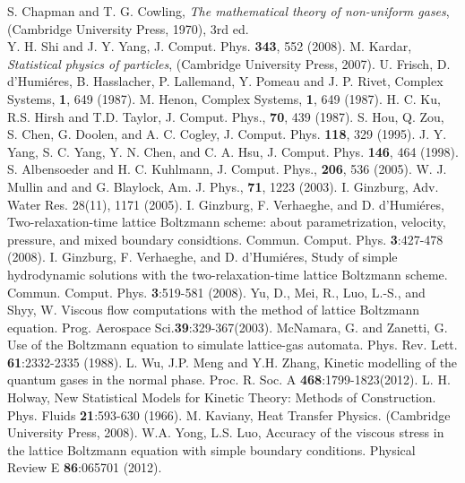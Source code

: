 \documentclass[doublecol]{epl2}
\begin{document}
\begin{thebibliography}{0}
 S. Chapman and  T. G. Cowling, {\sl The mathematical theory of non-uniform gases}, (Cambridge University Press, 1970), 3rd ed. \\
 Y. H. Shi and J. Y. Yang, J. Comput. Phys. {\bf 343}, 552 (2008).
 M. Kardar, {\sl Statistical physics of particles}, (Cambridge University Press, 2007).
 U. Frisch, D. d'Humi\'{e}res, B. Hasslacher, P. Lallemand, Y. Pomeau and J. P. Rivet, Complex Systems, {\bf 1}, 649 (1987).
 M. Henon, Complex Systems, {\bf 1}, 649 (1987).
 H. C. Ku, R.S. Hirsh and T.D. Taylor, J. Comput. Phys., {\bf 70}, 439 (1987).
S. Hou, Q. Zou, S. Chen, G. Doolen, and A. C. Cogley, J. Comput. Phys. {\bf 118}, 329 (1995).
J. Y. Yang, S. C. Yang, Y. N. Chen, and C. A. Hsu, J. Comput. Phys. {\bf 146}, 464 (1998).
 S. Albensoeder and H. C. Kuhlmann, J. Comput. Phys., {\bf 206}, 536 (2005).
 W. J. Mullin and and G. Blaylock, Am. J. Phys., {\bf 71}, 1223 (2003).
I. Ginzburg, Adv. Water Res. 28(11), 1171 (2005).
 I. Ginzburg, F. Verhaeghe, and D. d'Humi\'{e}res, Two-relaxation-time lattice Boltzmann scheme: about parametrization, velocity, pressure, and mixed boundary considtions.  Commun. Comput. Phys. {\bf 3}:427-478 (2008).
 I. Ginzburg, F. Verhaeghe, and D. d'Humi\'{e}res,
Study of simple hydrodynamic solutions with the two-relaxation-time lattice Boltzmann scheme.  Commun. Comput. Phys. {\bf 3}:519-581 (2008).
 Yu, D., Mei, R., Luo, L.-S., and Shyy, W. Viscous flow computations
with the method of lattice Boltzmann equation. Prog. Aerospace Sci.{\bf 39}:329-367(2003).
 McNamara, G. and Zanetti, G. Use of the Boltzmann equation to simulate
lattice-gas automata. Phys. Rev. Lett. {\bf 61}:2332-2335 (1988).
 L. Wu, J.P. Meng  and Y.H. Zhang, Kinetic modelling of the quantum gases in the normal phase. Proc. R. Soc. A {\bf 468}:1799-1823(2012).
 L. H. Holway, New Statistical Models for Kinetic Theory: Methods of Construction. Phys. Fluids {\bf 21}:593-630 (1966).
 M. Kaviany, Heat Transfer Physics. (Cambridge University Press, 2008).
 W.A. Yong, L.S. Luo, Accuracy of the viscous stress in the lattice Boltzmann equation with simple boundary conditions. Physical Review E {\bf 86}:065701 (2012).

\end{thebibliography}
\end{document}
